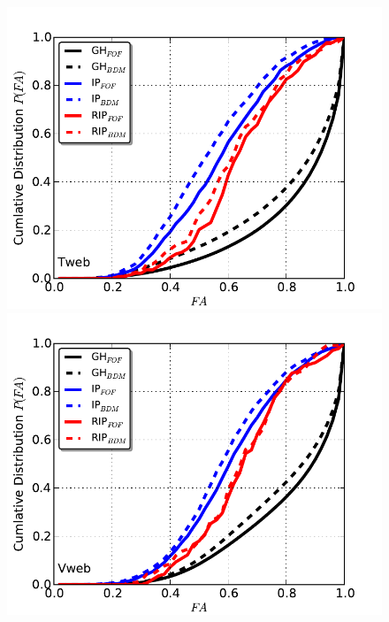 \documentclass[usenatbib]{latex/mn2e}
\begin{document}
\begin{flushleft}
\begin{figure}
\begin{center}

  \includegraphics[trim = 0mm 0mm 0mm 0mm, clip, keepaspectratio=true,
  width=0.3\textheight]{./figures/fractional_anisotrpy_Tweb}
  \includegraphics[trim = 0mm 0mm 0mm 0mm, clip, keepaspectratio=true,
  width=0.3\textheight]{./figures/fractional_anisotrpy_Vweb}
  

\end{center}
\end{figure}
\end{flushleft}
\end{document}
